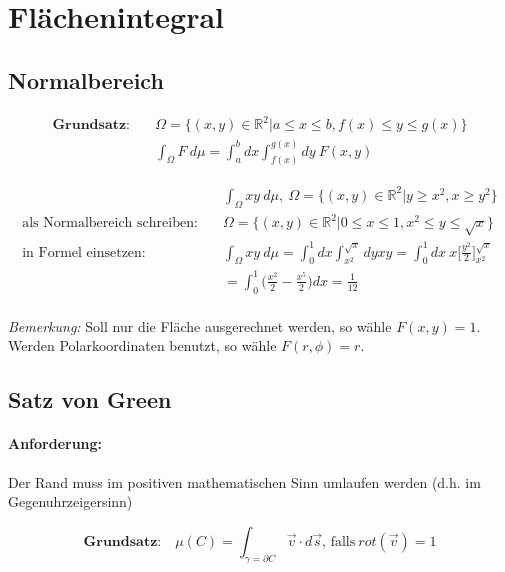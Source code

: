 \documentclass[11pt]{article}
\begin{document}
\section{Fl{\"a}chenintegral}

\subsection{Normalbereich}

\begin{equation*}
\begin{split}
	\textbf{Grundsatz:}\quad & \Omega = \{(x,y) \in \mathbb{R}^2| a \leq x \leq b, f(x) \leq y \leq g(x)\} \\
	& \int_\Omega F\ d\mu = \int_a^b dx \int_{f(x)}^{g(x)} dy\ F(x,y)
\end{split}
\end{equation*}

\begin{equation*}
\begin{split}
	& \int_\Omega xy\ d\mu,\ \Omega = \{(x,y) \in \mathbb{R}^2| y \geq x^2, x \geq y^2 \} \\
	\text{als Normalbereich schreiben:}\quad & \Omega = \{(x,y) \in \mathbb{R}^2| 0 \leq x \leq 1, x^2 \leq y \leq \sqrt{x}\} \\
	\text{in Formel einsetzen:}\quad & \int_\Omega xy\ d\mu = \int_0^1 dx\int_{x^2}^{\sqrt{x}} dyxy = \int_0^1 dx\ x \Big[\frac{y^2}{2}\Big]_{x^2}^{\sqrt{x}} \\
	& = \int_0^1 \Big(\frac{x^2}{2}-\frac{x^5}{2}\Big)dx = \frac{1}{12} \\
\end{split}
\end{equation*}

\emph{Bemerkung:} Soll nur die Fl{\"a}che ausgerechnet werden, so w{\"a}hle $F(x,y) = 1$. Werden Polarkoordinaten benutzt, so w{\"a}hle $F(r, \phi) = r$.

\clearpage

\subsection{Satz von Green}

\paragraph{Anforderung:} Der Rand muss im positiven mathematischen Sinn umlaufen werden (d.h. im Gegenuhrzeigersinn)

\begin{equation*}
	\textbf{Grundsatz:}\quad \mu(C) = \int_{\gamma = \partial C} \vec{v} \cdot d\vec{s}\text{, falls}\ rot(\vec{v}) = 1
\end{equation*}
\end{document}
